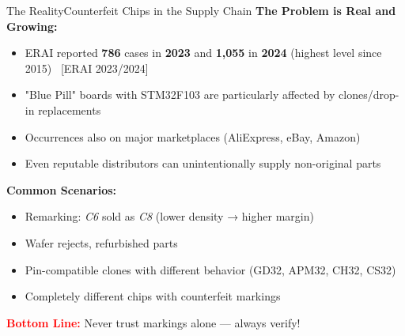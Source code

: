 \documentclass{beamer}
\begin{document}
\begin{frame}{The Reality}{Counterfeit Chips in the Supply Chain}
	\textbf{The Problem is Real and Growing:}
	\begin{itemize}
		\item ERAI reported \textbf{786} cases in \textbf{2023} and \textbf{1,055} in \textbf{2024} (highest level since 2015)%
		\footnotesize~[ERAI 2023/2024]%
		\item "Blue Pill" boards with STM32F103 are particularly affected by clones/drop-in replacements
		\item Occurrences also on major marketplaces (AliExpress, eBay, Amazon)
		\item Even reputable distributors can unintentionally supply non-original parts
	\end{itemize}
	
	\medskip
	\textbf{Common Scenarios:}
	\begin{itemize}
		\item Remarking: \textit{C6} sold as \textit{C8} (lower density → higher margin)
		\item Wafer rejects, refurbished parts
		\item Pin-compatible clones with different behavior (GD32, APM32, CH32, CS32)
		\item Completely different chips with counterfeit markings
	\end{itemize}
	
	\medskip
	\textcolor{red}{\textbf{Bottom Line:}} Never trust markings alone — always verify!
\end{frame}
\end{document}
